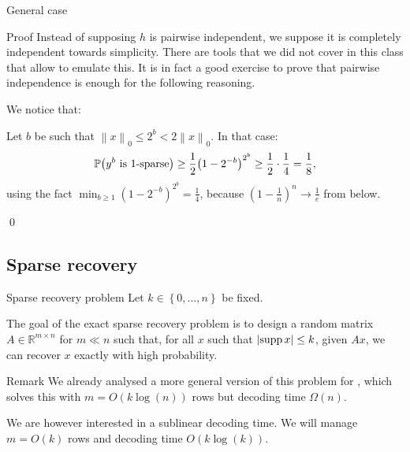 \documentclass[a4paper]{article}
\begin{document}
\begin{parag}{General case}
    \begin{subparag}{Proof}
        Instead of supposing $h$ is pairwise independent, we suppose it is completely independent towards simplicity. There are tools that we did not cover in this class that allow to emulate this. It is in fact a good exercise to prove that pairwise independence is enough for the following reasoning.

        We notice that:
        
        Let $b$ be such that $\left\|x\right\|_0 \leq 2^b < 2 \left\|x\right\|_0$. In that case: 
        \[\prob\left(y^b \text{ is 1-sparse}\right) \geq \frac{1}{2} \left(1 - 2^{-b}\right)^{2^b} \geq \frac{1}{2}\cdot \frac{1}{4} = \frac{1}{8},\]
        using the fact $\min_{b \geq 1} \left(1 - 2^{-b}\right)^{2^b} = \frac{1}{4}$, because $\left(1 - \frac{1}{n}\right)^n \to \frac{1}{e}$ from below.

        \qed
    \end{subparag}
\end{parag}

\subsection{Sparse recovery}

\begin{parag}{Sparse recovery problem}
    Let $k \in \left\{0, \ldots, n\right\}$ be fixed. 

    The goal of the exact sparse recovery problem is to design a random matrix $A \in \mathbb{R}^{m \times n}$ for $m \ll n$ such that, for all $x$ such that $\left|\supp x\right| \leq k$, given $Ax$, we can recover $x$ exactly with high probability.

    \begin{subparag}{Remark}
        We already analysed a more general version of this problem for , which solves this with $m = O\left(k \log\left(n\right)\right)$ rows but decoding time $\Omega\left(n\right)$. 

        We are however interested in a sublinear decoding time. We will manage $m = O\left(k\right)$ rows and decoding time $O\left(k \log\left(k\right)\right)$.
    \end{subparag}
\end{parag}
\end{document}
